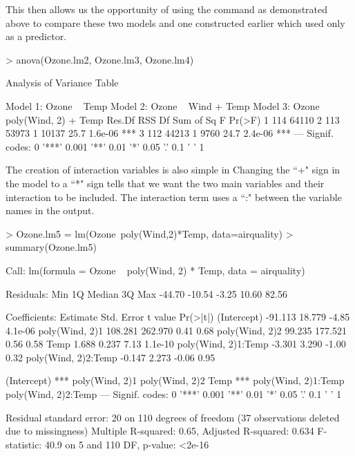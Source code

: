This then allows us the opportunity of using the  command as demonstrated above to compare these two models and one constructed earlier which used only  as a predictor. 

\begin{Schunk}
\begin{Sinput}
> anova(Ozone.lm2, Ozone.lm3, Ozone.lm4) 
\end{Sinput}
\begin{Soutput}
Analysis of Variance Table

Model 1: Ozone ~ Temp
Model 2: Ozone ~ Wind + Temp
Model 3: Ozone ~ poly(Wind, 2) + Temp
  Res.Df   RSS Df Sum of Sq    F  Pr(>F)    
1    114 64110                              
2    113 53973  1     10137 25.7 1.6e-06 ***
3    112 44213  1      9760 24.7 2.4e-06 ***
---
Signif. codes:  
0 '***' 0.001 '**' 0.01 '*' 0.05 '.' 0.1 ' ' 1
\end{Soutput}
\end{Schunk}

 
The creation of interaction variables is also simple in \R{} Changing the ``+" sign in the model to a ``*" sign tells \R{} that we want the two main variables and their interaction to be included. The interaction term uses a ``:" between the variable names in the output. 

\begin{Schunk}
\begin{Sinput}
> Ozone.lm5 = lm(Ozone~poly(Wind,2)*Temp, data=airquality) 
> summary(Ozone.lm5) 
\end{Sinput}
\begin{Soutput}

Call:
lm(formula = Ozone ~ poly(Wind, 2) * Temp, data = airquality)

Residuals:
   Min     1Q Median     3Q    Max 
-44.70 -10.54  -3.25  10.60  82.56 

Coefficients:
                    Estimate Std. Error t value Pr(>|t|)
(Intercept)          -91.113     18.779   -4.85  4.1e-06
poly(Wind, 2)1       108.281    262.970    0.41     0.68
poly(Wind, 2)2        99.235    177.521    0.56     0.58
Temp                   1.688      0.237    7.13  1.1e-10
poly(Wind, 2)1:Temp   -3.301      3.290   -1.00     0.32
poly(Wind, 2)2:Temp   -0.147      2.273   -0.06     0.95
                       
(Intercept)         ***
poly(Wind, 2)1         
poly(Wind, 2)2         
Temp                ***
poly(Wind, 2)1:Temp    
poly(Wind, 2)2:Temp    
---
Signif. codes:  
0 '***' 0.001 '**' 0.01 '*' 0.05 '.' 0.1 ' ' 1

Residual standard error: 20 on 110 degrees of freedom
  (37 observations deleted due to missingness)
Multiple R-squared:  0.65,	Adjusted R-squared:  0.634 
F-statistic: 40.9 on 5 and 110 DF,  p-value: <2e-16
\end{Soutput}
\end{Schunk}

